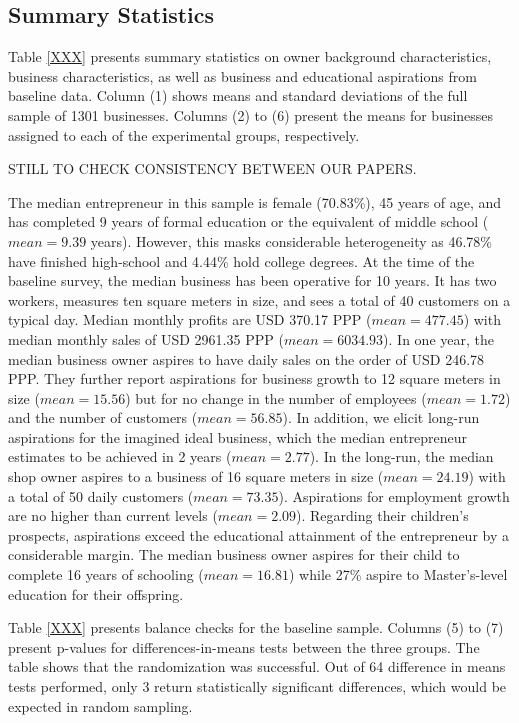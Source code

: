 \documentclass[11.5pt]{article}
\begin{document}
\subsection{Summary Statistics}

Table \ref{XXX} presents summary statistics on owner background characteristics, business characteristics, as well as business and educational aspirations from baseline data. Column (1) shows means and standard deviations of the full sample of 1301 businesses. Columns (2) to (6) present the means for businesses assigned to each of the experimental groups, respectively.

\textcolor[rgb]{1.00,0.00,0.00}{STILL TO CHECK CONSISTENCY BETWEEN OUR PAPERS.}

The median entrepreneur in this sample is female (70.83\%), 45 years of age, and has completed 9 years of formal education or the equivalent of middle school ($mean = 9.39$ years). However, this masks considerable heterogeneity as 46.78\% have finished high-school and 4.44\% hold college degrees. At the time of the baseline survey, the median business has been operative for 10 years. It has two workers, measures ten square meters in size, and sees a total of 40 customers on a typical day. Median monthly profits are USD 370.17 PPP ($mean = 477.45$) with median monthly sales of USD 2961.35 PPP ($mean = 6034.93$). In one year, the median business owner aspires to have daily sales on the order of USD 246.78 PPP. They further report aspirations for business growth to 12 square meters in size ($mean = 15.56$) but for no change in the number of employees ($mean = 1.72$) and the number of customers ($mean = 56.85$). In addition, we elicit long-run aspirations for the imagined ideal business, which the median entrepreneur estimates to be achieved in 2 years ($mean = 2.77$). In the long-run, the median shop owner aspires to a business of 16 square meters in size ($mean = 24.19$) with a total of 50 daily customers ($mean = 73.35$). Aspirations for employment growth are no higher than current levels ($mean = 2.09$). Regarding their children's prospects, aspirations exceed the educational attainment of the entrepreneur by a considerable margin. The median business owner aspires for their child to complete 16 years of schooling ($mean = 16.81$) while 27\% aspire to Master's-level education for their offspring.

Table \ref{XXX} presents balance checks for the baseline sample. Columns (5) to (7) present p-values for differences-in-means tests between the three groups. The table shows that the randomization was successful. Out of 64 difference in means tests performed, only 3 return statistically significant differences, which would be expected in random sampling.
\end{document}
